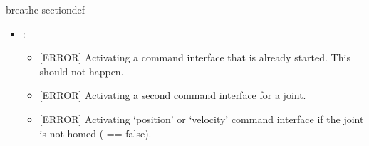 \documentclass[letterpaper,10pt,english]{sphinxmanual}
\begin{document}
\begin{fulllineitems}
\begin{sphinxuseclass}{breathe-sectiondef}
\begin{fulllineitems}
\begin{itemize}
\begin{itemize}
\item {} 
\sphinxAtStartPar
{[}WARN{]} Deactivating a command interface that has not been started. This should not happen.

\end{itemize}


\item {} 
\sphinxAtStartPar
{}:\begin{itemize}
\item {} 
\sphinxAtStartPar
{[}ERROR{]} Activating a command interface that is already started. This should not happen.

\item {} 
\sphinxAtStartPar
{[}ERROR{]} Activating a second command interface for a joint.

\item {} 
\sphinxAtStartPar
{[}ERROR{]} Activating ‘position’ or ‘velocity’ command interface if the joint is not homed ({\hyperref[\detokenize{code/bioscara_hardware_drivers/index:classbioscara__hardware__drivers_1_1BaseJoint_1ad010a69043a9ee4578cadeebc85d9c80}]{}} == false).

\end{itemize}


\end{itemize}


\end{fulllineitems}
\end{sphinxuseclass}
\end{fulllineitems}
\end{document}
